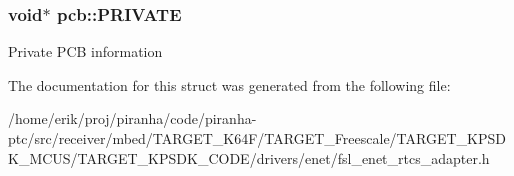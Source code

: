 \subsubsection[{\texorpdfstring{P\+R\+I\+V\+A\+TE}{PRIVATE}}]{\setlength{\rightskip}{0pt plus 5cm}void$\ast$ pcb\+::\+P\+R\+I\+V\+A\+TE}\hypertarget{structpcb_a986cbc4d4ee860e5891b0254d4f8af84}{}\label{structpcb_a986cbc4d4ee860e5891b0254d4f8af84}
Private P\+CB information 

The documentation for this struct was generated from the following file\+:\begin{DoxyCompactItemize}
\item 
/home/erik/proj/piranha/code/piranha-\/ptc/src/receiver/mbed/\+T\+A\+R\+G\+E\+T\+\_\+\+K64\+F/\+T\+A\+R\+G\+E\+T\+\_\+\+Freescale/\+T\+A\+R\+G\+E\+T\+\_\+\+K\+P\+S\+D\+K\+\_\+\+M\+C\+U\+S/\+T\+A\+R\+G\+E\+T\+\_\+\+K\+P\+S\+D\+K\+\_\+\+C\+O\+D\+E/drivers/enet/fsl\+\_\+enet\+\_\+rtcs\+\_\+adapter.\+h\end{DoxyCompactItemize}
